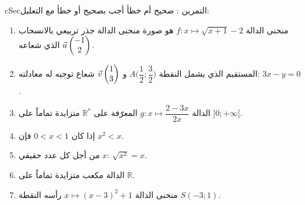 \documentclass[12pt,a4paper]{article}
\newenvironment{BOX}[2]{\begin{otherlanguage}{english}\begin{arbox}{#1}{#2}}{\end{arbox}\end{otherlanguage}}
\newcounter{exo}
\newenvironment{tamrin}[1]{\stepcounter{exo}\begin{BOX}{cSec}{التمرين \theexo: #1}}{\end{BOX}}
\newcommand{\R}{\mathbb{R}}
\begin{document}
\begin{tamrin}{صحيح أم خطأ}
أجب بصحيح أو خطأ مع التعليل:
\begin{enumerate}
\item منحنى الدالة $f:x\mapsto\sqrt{x+1}-2$ هو صورة منحنى الدالة جذر تربيعي بالانسحاب الذي شعاعه $\vec u\begin{pmatrix}-1\\2\end{pmatrix}$.
\item المستقيم الذي يشمل النقطة $A\Big(\dfrac12;\dfrac32\Big)$ و $\vec v\begin{pmatrix}1\\3\end{pmatrix}$ شعاع توجيه له معادلته: $3x-y=0$.
\item الدالة $g:x\mapsto\dfrac{2-3x}{2x}$ المعرّفة على $\R^*$ متزايدة تماماً على $]0;+\infty[$.
\item إذا كان $0<x<1$ فإن $x^2<x$.
\item من أجل كل عدد حقيقي $x$: $\sqrt{x^2}=x$.
\item الدالة مكعب متزايدة تماماً على $\R$.
\item منحنى الدالة $x\mapsto(x-3)^2+1$ رأسه النقطة $S(-3;1)$.
\end{enumerate}
\end{tamrin}
\end{document}

